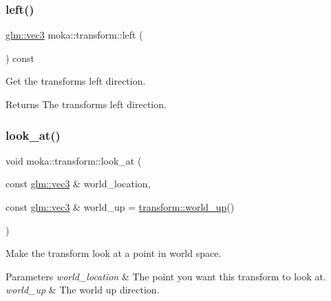 \subsubsection{\texorpdfstring{left()}{left()}}
{\footnotesize\ttfamily \mbox{\hyperlink{namespacemoka_aed2224bc0e5b79e57a8975ded94ee1aaa97ade28e93c0de60adc075bdbe07ca36}{glm\+::vec3}} moka\+::transform\+::left (\begin{DoxyParamCaption}{ }\end{DoxyParamCaption}) const}



Get the transform\textquotesingle{}s left direction. 

\begin{DoxyReturn}{Returns}
The transform\textquotesingle{}s left direction. 
\end{DoxyReturn}
\mbox{\label{classmoka_1_1transform_afbad251b87847b7d52dbbd360ebd62b3}} 
\subsubsection{\texorpdfstring{look\_at()}{look\_at()}}
{\footnotesize\ttfamily void moka\+::transform\+::look\+\_\+at (\begin{DoxyParamCaption}\item[{const \mbox{\hyperlink{namespacemoka_aed2224bc0e5b79e57a8975ded94ee1aaa97ade28e93c0de60adc075bdbe07ca36}{glm\+::vec3}} \&}]{world\+\_\+location,  }\item[{const \mbox{\hyperlink{namespacemoka_aed2224bc0e5b79e57a8975ded94ee1aaa97ade28e93c0de60adc075bdbe07ca36}{glm\+::vec3}} \&}]{world\+\_\+up = {\ttfamily \mbox{\hyperlink{classmoka_1_1transform_afb4410934686c722f0215a06a7984d61}{transform\+::world\+\_\+up}}()} }\end{DoxyParamCaption})}



Make the transform look at a point in world space. 


\begin{DoxyParams}{Parameters}
{\em world\+\_\+location} & The point you want this transform to look at. \\
\hline
{\em world\+\_\+up} & The world up direction. \\
\hline
\end{DoxyParams}
\mbox{\label{classmoka_1_1transform_a0283f5129ddc7c7bc12561b330729b26}} 
